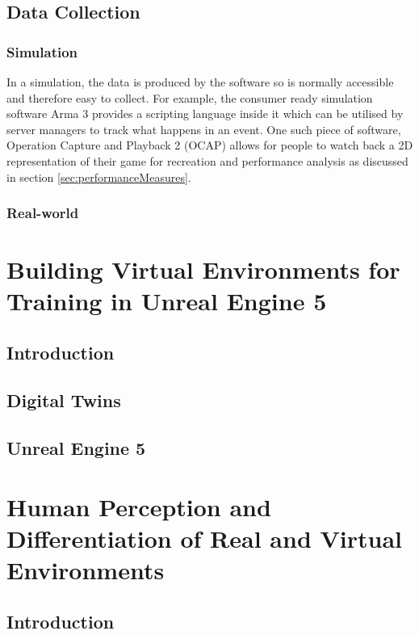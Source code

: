 \documentclass[12pt]{article}
\begin{document}
\subsection{Data Collection}

\subsubsection{Simulation}

In a simulation, the data is produced by the software so is normally accessible and therefore easy to collect. For example, the consumer ready simulation software Arma 3 provides a scripting language inside it which can be utilised by server managers to track what happens in an event. One such piece of software, Operation Capture and Playback 2 (OCAP) allows for people to watch back a 2D representation of their game for recreation and performance analysis as discussed in section \ref{sec:performanceMeasures}.

\subsubsection{Real-world}

\section{Building Virtual Environments for Training in Unreal Engine 5}

\subsection{Introduction}

\subsection{Digital Twins}

\subsection{Unreal Engine 5}

\section{Human Perception and Differentiation of Real and Virtual Environments}

\subsection{Introduction}
\end{document}
